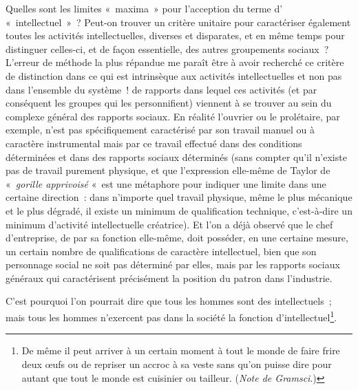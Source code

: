 \documentclass[french,twoside]{book} %
\begin{document}
\noindent Quelles sont les limites « maxima » pour l’acception du terme d’ « intellectuel » ? Peut-on trouver un critère unitaire pour caractériser également toutes les activités intellectuelles, diverses et disparates, et en même temps pour distinguer celles-ci, et de façon essentielle, des autres groupements sociaux ? L'erreur de méthode la plus répandue me paraît être à avoir recherché ce critère de distinction dans ce qui est intrinsèque aux activités intellectuelles et non pas dans l’ensemble du système ! de rapports dans lequel ces activités (et par conséquent les groupes qui les personnifient) viennent à se trouver au sein du complexe général des rapports sociaux. En réalité l’ouvrier ou le prolétaire, par exemple, n’est pas spécifiquement caractérisé par son travail manuel ou à caractère instrumental mais par ce travail effectué dans des conditions déterminées et dans des rapports sociaux déterminés (sans compter qu’il n’existe pas de travail purement physique, et que l’expression elle-même de Taylor de « \emph{gorille apprivoisé} « est une métaphore pour indiquer une limite dans une certaine direction : dans n’importe quel travail physique, même le plus mécanique et le plus dégradé, il existe un minimum de qualification technique, c’est-à-dire un minimum d’activité intellectuelle créatrice). Et l’on a déjà observé que le chef d’entreprise, de par sa fonction elle-même, doit posséder, en une certaine mesure, un certain nombre de qualifications de caractère intellectuel, bien que son personnage social ne soit pas déterminé par elles, mais par les rapports sociaux généraux qui caractérisent précisément la position du patron dans l’industrie.\par
C'est pourquoi l’on pourrait dire que tous les hommes sont des intellectuels ; mais tous les hommes n’exercent pas dans la société la fonction d’intellectuel\footnote{De même il peut arriver à un certain moment à tout le monde de faire frire deux œufs ou de repriser un accroc à sa veste sans qu’on puisse dire pour autant que tout le monde est cuisinier ou tailleur. (\emph{Note de Gramsci}.)}.\par
\end{document}
